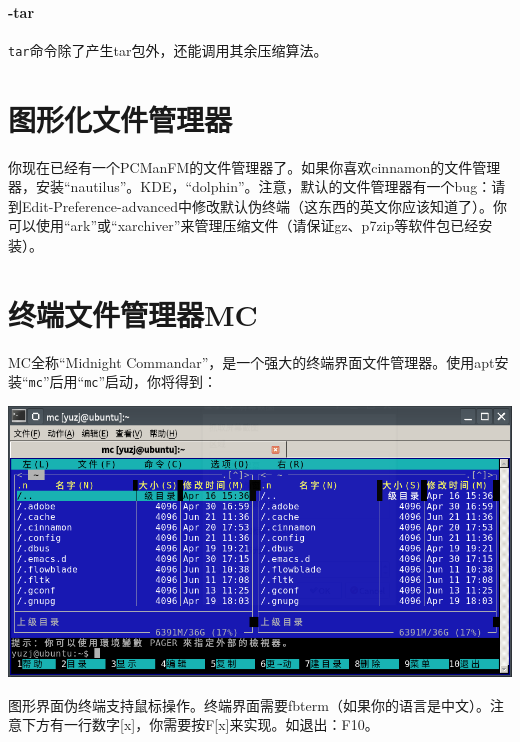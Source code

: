 \paragraph{-tar}
\verb|tar|命令除了产生tar包外，还能调用其余压缩算法。
\section{图形化文件管理器}
你现在已经有一个PCManFM的文件管理器了。如果你喜欢cinnamon的文件管理器，安装“nautilus”。KDE，“dolphin”。注意，默认的文件管理器有一个bug：请到Edit-Preference-advanced中修改默认伪终端（这东西的英文你应该知道了）。你可以使用“ark”或“xarchiver”来管理压缩文件（请保证gz、p7zip等软件包已经安装）。
\section{终端文件管理器MC}
MC全称“Midnight Commandar”，是一个强大的终端界面文件管理器。使用apt安装“\verb|mc|”后用“\verb|mc|”启动，你将得到：
\begin{center}
	\includegraphics[width=0.7\linewidth]{pic/mc}
\end{center} \par
图形界面伪终端支持鼠标操作。终端界面需要fbterm（如果你的语言是中文）。注意下方有一行数字[x]，你需要按F[x]来实现。如退出：F10。
